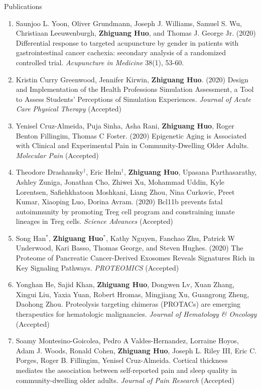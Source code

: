 \documentclass{resume} %
\begin{document}
\begin{rSection}{Publications}
\begin{enumerate}[noitemsep,topsep=0pt]
\item 
Saunjoo L. Yoon, Oliver Grundmann, Joseph J. Williams, Samuel S. Wu, Christiaan Leeuwenburgh, {\bf Zhiguang Huo}, and Thomas J. George Jr. (2020)
Differential response to targeted acupuncture by gender in patients with gastrointestinal cancer cachexia: secondary analysis of a randomized controlled trial.
\emph{Acupuncture in Medicine}  38(1), 53-60.

\item
Kristin Curry Greenwood,  Jennifer Kirwin, {\bf Zhiguang Huo}. (2020)
Design and Implementation of the Health Professions Simulation Assessment, a Tool to Assess Students’ Perceptions of Simulation Experiences. \emph{Journal of Acute Care Physical Therapy}  (Accepted)

\item Yenisel Cruz-Almeida, Puja Sinha, Asha Rani, {\bf Zhiguang Huo}, Roger Benton Fillingim, Thomas C Foster. (2020)
Epigenetic Aging is Associated with Clinical and Experimental Pain in Community-Dwelling Older Adults.
\emph{Molecular Pain} (Accepted)  


\item 
Theodore Drashansky$^\dagger$, Eric  Helm$^\dagger$, {\bf Zhiguang Huo}, Upasana Parthasarathy,  Ashley Zuniga, Jonathan Cho, Zhiwei Xu,  Mohammad Uddin,  Kyle Lorentsen, Safiehkhatoon Moshkani, Liang Zhou, Nina Curkovic, Preet Kumar,  Xiaoping Luo, Dorina Avram. (2020)
Bcl11b prevents fatal autoimmunity by promoting Treg cell program and constraining innate lineages in Treg cells. 
\emph{Science Advances} (Accepted)

\item Song Han$^*$, {\bf Zhiguang Huo}$^*$,  Kathy Nguyen,  Fanchao Zhu, Patrick W Underwood, Kari Basso, Thomas George, and Steven Hughes. (2020)
The Proteome of Pancreatic Cancer-Derived Exosomes Reveals Signatures Rich in Key Signaling Pathways. \emph{PROTEOMICS} (Accepted)

\item
Yonghan He, Sajid Khan, {\bf Zhiguang Huo}, Dongwen Lv, Xuan Zhang, Xingui Liu, Yaxia Yuan, Robert Hromas, Mingjiang Xu, Guangrong Zheng, Daohong Zhou. 
Proteolysis targeting chimeras (PROTACs) are emerging therapeutics for hematologic malignancies.
\emph{Journal of Hematology \& Oncology} (Accepted)

\item  
Soamy Montesino-Goicolea, Pedro A Valdes-Hernandez,  Lorraine Hoyos, Adam J. Woods, Ronald Cohen,  {\bf Zhiguang Huo}, Joseph L. Riley III, Eric C. Porges, Roger B. Fillingim, Yenisel Cruz-Almeida. 
Cortical thickness mediates the association between self-reported pain and sleep quality in community-dwelling older adults. 
\emph{Journal of Pain Research} (Accepted)


\end{enumerate}
\end{rSection}
\end{document}

